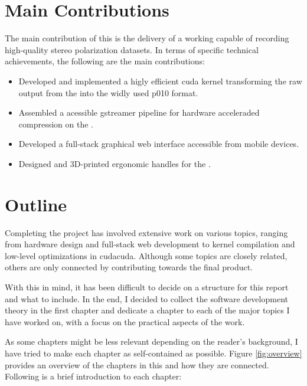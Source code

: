 \section{Main Contributions}
The main contribution of this \master is the delivery of a working \sr capable of recording high-quality stereo polarization datasets.
In terms of specific technical achievements, the following are the main contributions:

\begin{itemize}
    \item Developed and implemented a higly efficient \gls{cuda} kernel transforming the raw output from the \cams into the widly used \gls{p010} format.
    \item Assembled a \py acessible \gls{gstreamer} pipeline for hardware acceleraded compression on the \jx.
    \item Developed a full-stack graphical web interface accessible from mobile devices.
    \item Designed and 3D-printed ergonomic handles for the \sr.
\end{itemize}


\section{Outline}
Completing the \sr project has involved extensive work on various topics, ranging from hardware design and full-stack web development to kernel compilation and low-level optimizations in \gls{cuda}{cuda}.
Although some topics are closely related, others are only connected by contributing towards the final product.

With this in mind, it has been difficult to decide on a structure for this report and what to include.
In the end, I decided to collect the software development theory in the first chapter and dedicate a chapter to each of the major topics I have worked on, with a focus on the practical aspects of the work.

As some chapters might be less relevant depending on the reader's background, I have tried to make each chapter as self-contained as possible.
Figure \ref{fig:overview} provides an overview of the chapters in this \master and how they are connected.
Following is a brief introduction to each chapter:

